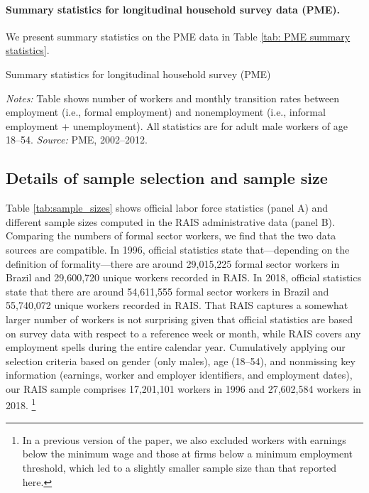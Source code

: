 \clearpage


\paragraph{Summary statistics for longitudinal household survey data (PME).}

We present summary statistics on the PME data in Table \ref{tab: PME summary statistics}.

\begin{table}[!htb]
  \centering
  \caption{Summary statistics for longitudinal household survey (PME)\label{tab: PME summary statistics}}
  \pretabvspace
  
  \posttabvspace
  \begin{minipage}[t]{1\columnwidth}%
    \begin{spacing}{0.75}
      \emph{\scriptsize{}Notes:}{\scriptsize{} Table shows number of workers and monthly transition rates between employment (i.e., formal employment) and nonemployment
      (i.e., informal employment + unemployment). All statistics are for adult male workers of age 18--54. %
      \emph{\scriptsize{}Source:} PME, 2002--2012.}
    \end{spacing}
  \end{minipage}
\end{table}




\clearpage
\subsection{Details of sample selection and sample size\label{app_subsec:sample_selection_size}}

Table \ref{tab:sample_sizes} shows official labor force statistics (panel A) and different sample sizes computed in the RAIS administrative data (panel B). Comparing the numbers of formal sector workers, we find that the two data sources are compatible. In 1996, official statistics state that---depending on the definition of formality---there are around 29,015,225 formal sector workers in Brazil and 29,600,720 unique workers recorded in RAIS. In 2018, official statistics state that there are around 54,611,555 formal sector workers in Brazil and 55,740,072 unique workers recorded in RAIS. That RAIS captures a somewhat larger number of workers is not surprising given that official statistics are based on survey data with respect to a reference week or month, while RAIS covers any employment spells during the entire calendar year. Cumulatively applying our selection criteria based on gender (only males), age (18--54), and nonmissing key information (earnings, worker and employer identifiers, and employment dates), our RAIS sample comprises 17,201,101 workers in 1996 and 27,602,584 workers in 2018.%
%
\footnote{In a previous version of the paper, we also excluded workers with earnings below the minimum wage and those at firms below a minimum employment threshold, which led to a slightly smaller sample size than that reported here.} %
%

